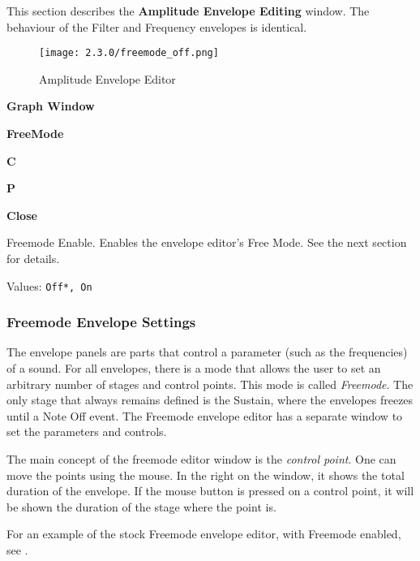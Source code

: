    This section describes the \textbf{Amplitude Envelope Editing} window. The behaviour of the Filter and Frequency envelopes is identical.

\begin{figure}[H]
   \centering
   \texttt{[image: 2.3.0/freemode\_off.png]}
   \caption{Amplitude Envelope Editor}
   \label{fig:amplitude_envelope_editor}
\end{figure}

   \begin{enumber}
      \item \textbf{Graph Window}
      \item \textbf{FreeMode}
      \item \textbf{C}
      \item \textbf{P}
      \item \textbf{Close}
   \end{enumber}

   \setcounter{ItemCounter}{0}      %

   Freemode Enable.
   Enables the envelope editor's Free Mode.
   See the next section for details.

   Values: \texttt{Off*, On} \\

\subsubsection{Freemode Envelope Settings}
\label{subsubsec:freemode_envelope_settings}

   The envelope panels are parts that control a parameter (such as the
   frequencies) of a sound.  For all envelopes, there is a mode that allows the
   user to set an arbitrary number of stages and control points. This mode is
   called \textsl{Freemode}.  The only stage that always remains defined is the
   Sustain, where the envelopes freezes until a Note Off event.  The Freemode
   envelope editor has a separate window to set the parameters and controls.

   The main concept of the freemode editor window is the
   \textsl{control point}.
   One can move the points using the mouse. In the right on the
   window, it shows the total duration of the envelope. If the mouse button
   is pressed on a control point, it will be shown the duration of the
   stage where the point is.

   For an example of the stock Freemode envelope editor, with
   Freemode enabled, see .

